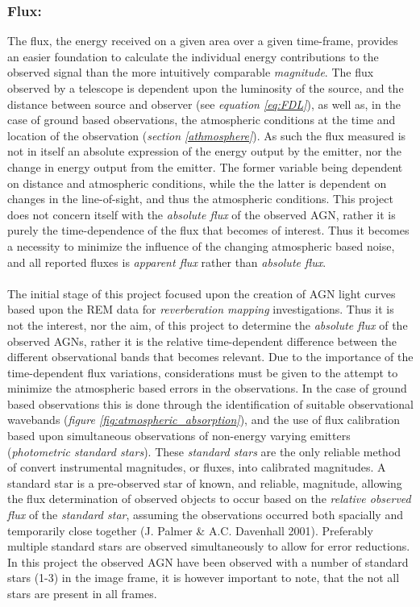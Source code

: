 \documentclass[a4paper, 12pt, twoside]{article}
\begin{document}
\subsubsection{Flux:} \label{flux}
The flux, the energy received on a given area over a given time-frame, provides an easier foundation to calculate the individual energy contributions to the observed signal than the more intuitively comparable \emph{magnitude}. The flux observed by a telescope is dependent upon the luminosity of the source, and the distance between source and observer (see \emph{equation \ref{eq:FDL}}), as well as, in the case of ground based observations, the atmospheric conditions at the time and location of the observation (\emph{section \ref{athmosphere}}). As such the flux measured is not in itself an absolute expression of the energy output by the emitter, nor the change in energy output from the emitter. The former variable being dependent on distance and atmospheric conditions, while the the latter is dependent on changes in the line-of-sight, and thus the atmospheric conditions. This project does not concern itself with the \emph{absolute flux} of the observed AGN, rather it is purely the time-dependence of the flux that becomes of interest. Thus it becomes a necessity to minimize the influence of the changing atmospheric based noise, and all reported fluxes is \emph{apparent flux} rather than \emph{absolute flux}. \\
\\
The initial stage of this project focused upon the creation of AGN light curves based upon the REM data for \emph{reverberation mapping} investigations. Thus it is not the interest, nor the aim, of this project to determine the \emph{absolute flux} of the observed AGNs, rather it is the relative time-dependent difference between the different observational bands that becomes relevant. Due to the importance of the time-dependent flux variations, considerations must be given to the attempt to minimize the atmospheric based errors in the observations. In the case of ground based observations this is done through the identification of suitable observational wavebands (\emph{figure \ref{fig:atmospheric_absorption}}), and the use of flux calibration based upon simultaneous observations of non-energy varying emitters (\emph{photometric standard stars}). These \emph{standard stars} are the only reliable method of convert instrumental magnitudes, or fluxes, into calibrated magnitudes. A standard star is a pre-observed star of known, and reliable, magnitude, allowing the flux determination of observed objects to occur based on the \emph{relative observed flux} of the \emph{standard star}, assuming the observations occurred both spacially and temporarily close together (J. Palmer \& A.C. Davenhall 2001\cite{CCD:COOK}). Preferably multiple standard stars are observed simultaneously to allow for error reductions. In this project the observed AGN have been observed with a number of standard stars (1-3) in the image frame, it is however important to note, that the not all stars are present in all frames. \\
\end{document}
